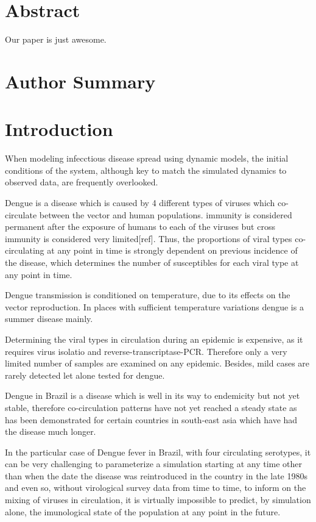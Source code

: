 \section*{Abstract}
Our paper is just awesome.
\section*{Author Summary}

\section*{Introduction}
When modeling infecctious disease spread using dynamic models, the initial 
conditions of the system, although key to match the simulated dynamics to 
observed data, are frequently overlooked.

Dengue is a disease which is caused by 4 different types of viruses 
which co-circulate between the vector and human populations. immunity is 
considered permanent after the exposure of humans to each of the viruses but 
cross immunity is considered very limited[ref].
Thus, the proportions of viral types co-circulating at any point in time is 
strongly dependent on previous incidence of the disease, which determines the 
number of susceptibles for each viral type at any point in time.

Dengue transmission is conditioned on temperature, due to its effects on the 
vector reproduction.
In places with sufficient temperature variations dengue is a summer disease 
mainly. 

Determining the viral types in circulation during an epidemic is 
expensive, as it requires virus isolatio and reverse-transcriptase-PCR. 
Therefore only a very limited number of samples are examined on any epidemic. 
Besides, mild cases are rarely detected let alone tested for dengue.

Dengue in Brazil is a disease which is well in its way to 
endemicity but not yet stable, therefore co-circulation patterns have not yet 
reached a steady state as has been demonstrated for certain countries in 
south-east asia which have had the disease much longer.

In the particular case of Dengue fever in Brazil, with four circulating 
serotypes, it can be very challenging to parameterize a simulation starting at 
any time other than when the date the disease was reintroduced in the country 
in the late 1980s and even so, without virological survey data from time to 
time, to inform on the mixing of viruses in circulation, it is virtually 
impossible to predict, by simulation alone, the imunological state of the 
population at any point in the future.

